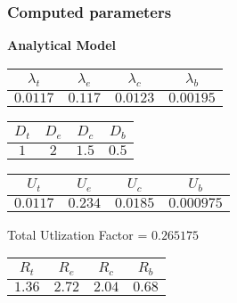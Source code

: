 \documentclass{article}
\begin{document}
\subsubsection{Computed parameters}
\begin{minipage}{0.5\textwidth}
\centering	\textbf{Analytical Model}
\begin{table}[H]
\centering
\begin{tabular}{@{}cccc@{}}
\toprule
$\lambda_t$ & $\lambda_e$ & $\lambda_c$ & $\lambda_b$\\
\midrule
$0.0117$ & $0.117$ & $0.0123$ & $0.00195$\\
\bottomrule
\end{tabular}
\end{table}\begin{table}[H]
\centering
\begin{tabular}{@{}cccc@{}}
\toprule
$D_t$ & $D_e$ & $D_c$ & $D_b$\\
\midrule
$1$ & $2$ & $1.5$ & $0.5$\\
\bottomrule
\end{tabular}
\end{table}\begin{table}[H]
\centering
\begin{tabular}{@{}cccc@{}}
\toprule
$U_t$ & $U_e$ & $U_c$ & $U_b$\\
\midrule
$0.0117$ & $0.234$ & $0.0185$ & $0.000975$\\
\bottomrule
\end{tabular}
\end{table}
\centering Total Utlization Factor = $0.265175$
\begin{table}[H]
\centering
\begin{tabular}{@{}cccc@{}}
\toprule
$R_t$ & $R_e$ & $R_c$ & $R_b$\\
\midrule
$1.36$ & $2.72$ & $2.04$ & $0.68$\\
\bottomrule
\end{tabular}
\end{table}
\end{minipage}
\end{document}
